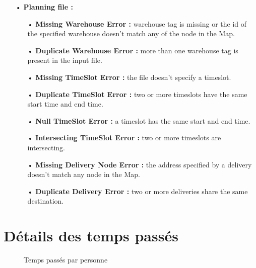 \documentclass[paper=a4, fontsize=11pt]{report}
\numberwithin{equation}{section}		%
\numberwithin{figure}{section}		%
\numberwithin{table}{section}		%
\begin{document}
\begin{itemize}
\begin{itemize}
    \item[•] \textbf{Planning file :}
    \begin{itemize}
      \item[•] \textbf{Missing Warehouse Error :} warehouse tag is missing or the id of the specified warehouse doesn’t match any of the node in the Map.
      \item[•] \textbf{Duplicate Warehouse Error :} more than one warehouse tag is present in the input file.
      \item[•] \textbf{Missing TimeSlot Error :} the file doesn’t specify a timeslot.
      \item[•] \textbf{Duplicate TimeSlot Error :} two or more timeslots have the same start time and end time.
      \item[•] \textbf{Null TimeSlot Error :} a timeslot has the same start and end time.
      \item[•] \textbf{Intersecting TimeSlot Error :} two or more timeslots are intersecting.
      \item[•] \textbf{Missing Delivery Node Error :} the address specified by a delivery doesn’t match any node in the Map.
      \item[•] \textbf{Duplicate Delivery Error :} two or more deliveries share the same destination. 
    \end{itemize}
  \end{itemize}
\end{itemize}


\label{sec:cr-des-taches-redmine}


\section{Détails des temps passés}
\label{sec:details-des-temps-passes}

\begin{figure}[H]
\centering
\noindent{}
\caption{Temps passés par personne}
\end{figure}

\end{document}
